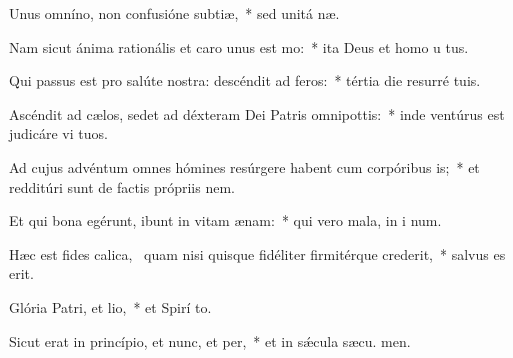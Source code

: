 \item Unus omníno, non confusióne subtiæ,~* sed unitá næ.
\item Nam sicut ánima rationális et caro unus est mo:~* ita Deus et homo u  tus.
\item Qui passus est pro salúte nostra: descéndit ad feros:~* tértia die resurré  tuis.
\item Ascéndit ad cælos, sedet ad déxteram Dei Patris omnipottis:~* inde ventúrus est judicáre vi  tuos.
\item Ad cujus advéntum omnes hómines resúrgere habent cum corpóribus is;~* et redditúri sunt de factis própriis nem.
\item Et qui bona egérunt, ibunt in vitam ænam:~* qui vero mala, in i num.
\item Hæc est fides calica,~\pscross{} quam nisi quisque fidéliter firmitérque crederit,~* salvus es  erit.
\item Glória Patri, et lio,~* et Spirí to.
\item Sicut erat in princípio, et nunc, et per,~* et in sǽcula sæcu. men.
